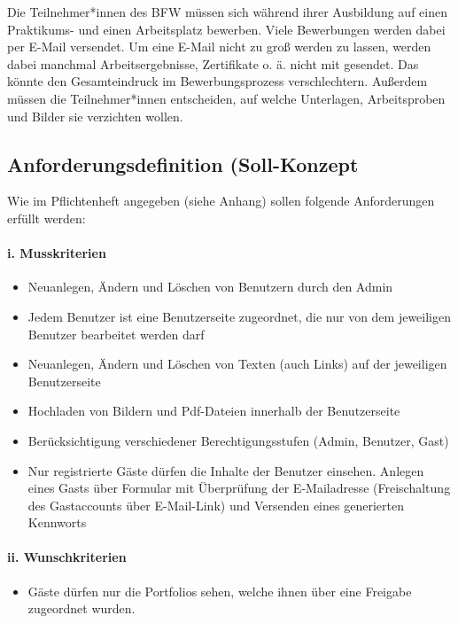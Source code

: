 \documentclass[10pt]{scrarticle}
\begin{document}
Die Teilnehmer*innen des BFW müssen sich während ihrer Ausbildung auf einen Praktikums- und einen Arbeitsplatz bewerben. Viele Bewerbungen werden dabei per E-Mail versendet. Um eine E-Mail nicht zu groß werden zu lassen, werden dabei manchmal Arbeitsergebnisse, Zertifikate o. ä. nicht mit gesendet. Das könnte den Gesamteindruck im Bewerbungsprozess verschlechtern.  
 Außerdem müssen die Teilnehmer*innen entscheiden, auf welche Unterlagen, Arbeitsproben und Bilder sie verzichten wollen.
 
\subsection{Anforderungsdefinition (Soll-Konzept}

Wie im Pflichtenheft angegeben (siehe Anhang) sollen folgende Anforderungen erfüllt werden:

\paragraph{i. Musskriterien}

\begin{itemize}
\item Neuanlegen, Ändern und Löschen von Benutzern durch den Admin
\item Jedem Benutzer ist eine Benutzerseite zugeordnet, die nur von dem jeweiligen Benutzer bearbeitet werden darf
\item Neuanlegen, Ändern und Löschen von Texten (auch Links) auf der jeweiligen Benutzerseite
\item Hochladen von Bildern und Pdf-Dateien innerhalb der Benutzerseite
\item Berücksichtigung verschiedener Berechtigungsstufen (Admin, Benutzer, Gast)
\item  Nur registrierte Gäste dürfen die Inhalte der Benutzer einsehen. Anlegen eines Gasts über Formular mit Überprüfung der E-Mailadresse (Freischaltung des Gastaccounts über E-Mail-Link) und Versenden eines generierten Kennworts 
\end{itemize}

\paragraph{ii. Wunschkriterien}

\begin{itemize}
\item Gäste dürfen nur die Portfolios sehen, welche ihnen über eine Freigabe zugeordnet wurden.
\end{itemize}
\end{document}
